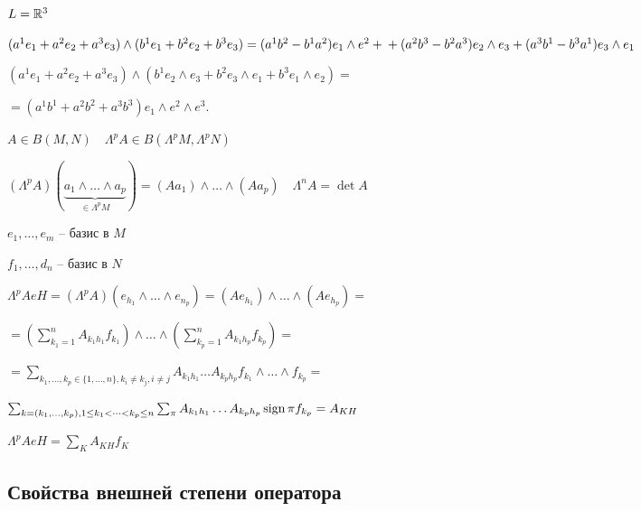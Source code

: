     \begin{illustration*}
        $L = \mathbb{R}^3$
        \par $(a^1e_1 + a^2e_2 + a^3e_3) \wedge (b^1e_1 + b^2e_2 + b^3e_3) = (a^1b^2 - b^1a^2) e_1 \wedge e^2 + \\ + (a^2b^3 - b^2a^3)e_2 \wedge e_3 + (a^3b^1 - b^3a^1)e_3 \wedge e_1$
        \par $(a^1e_1 + a^2e_2 + a^3e_3) \wedge (b^1e_2 \wedge e_3 + b^2 e_3 \wedge e_1 + b^3 e_1 \wedge e_2) =$
        \par $= (a^1b^1 + a^2b^2 + a^3b^3) e_1 \wedge e^2 \wedge e^3$.
    \end{illustration*}

    \par $A \in B(M, N) \quad \Lambda^pA \in B(\Lambda^p M, \Lambda^p N)$
    \par $(\Lambda^pA) (\underbrace{a_1 \wedge \dots \wedge a_p}_{\in \Lambda^p M}) = (Aa_1) \wedge \dots \wedge (Aa_p) \quad \Lambda^n A = \det A$
    \par $e_1, \dots, e_m$ -- базис в $M$
    \par $f_1, \dots, d_n$ -- базис в $N$
    \par $\Lambda^p A eH = (\Lambda^p A)(e_{h_1} \wedge \dots \wedge e_{n_p}) = (Ae_{h_1}) \wedge \dots \wedge (Ae_{h_p}) =$
    \par $= \left(\sum_{k_1 = 1}^n A_{k_1h_1} f_{k_1} \right) \wedge \dots \wedge \left(\sum_{k_p = 1}^n A_{k_1h_p} f_{k_p} \right) = $
    \par $ = \sum_{k_1, \dots, k_p \in \{1, \dots, n\}, k_i \not= k_j, i \not= j} A_{k_1h_1} \dots A_{k_ph_p} f_{k_1} \wedge \dots \wedge f_{k_p} = $
    \par $\sum_{k = (k_1, \dots, k_p), 1 \le k_1 < \dots < k_p \le n} \sum_\pi A_{k_1h_1} \dots A_{k_ph_p} \operatorname{sign}{\pi} f_{k_p} = A_{KH}$
    \par $\Lambda^p A e H = \sum_K A_{KH}f_K$
    
    \subsection*{Свойства внешней степени оператора}

